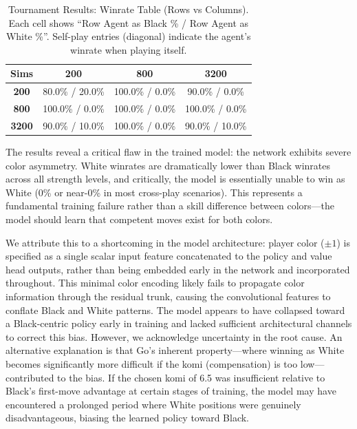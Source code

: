 \documentclass[12pt]{article}
\begin{document}
\begin{table}[h]
\centering
\caption{Tournament Results: Winrate Table (Rows vs Columns). Each cell shows ``Row Agent as Black \% / Row Agent as White \%''. Self-play entries (diagonal) indicate the agent's winrate when playing itself.}
\label{tab:tournament}
\begin{tabular}{c|ccc}
\hline
\textbf{Sims} & \textbf{200} & \textbf{800} & \textbf{3200} \\
\hline
\textbf{200}  & 80.0\% / 20.0\% & 100.0\% / 0.0\% & 90.0\% / 0.0\% \\
\textbf{800}  & 100.0\% / 0.0\% & 100.0\% / 0.0\% & 100.0\% / 0.0\% \\
\textbf{3200} & 90.0\% / 10.0\% & 100.0\% / 0.0\% & 90.0\% / 10.0\% \\
\hline
\end{tabular}
\end{table}

The results reveal a critical flaw in the trained model: the network exhibits severe color asymmetry. White winrates are dramatically lower than Black winrates across all strength levels, and critically, the model is essentially unable to win as White (0\% or near-0\% in most cross-play scenarios). This represents a fundamental training failure rather than a skill difference between colors—the model should learn that competent moves exist for both colors.

We attribute this to a shortcoming in the model architecture: player color ($\pm 1$) is specified as a single scalar input feature concatenated to the policy and value head outputs, rather than being embedded early in the network and incorporated throughout. This minimal color encoding likely fails to propagate color information through the residual trunk, causing the convolutional features to conflate Black and White patterns. The model appears to have collapsed toward a Black-centric policy early in training and lacked sufficient architectural channels to correct this bias. However, we acknowledge uncertainty in the root cause. An alternative explanation is that Go's inherent property—where winning as White becomes significantly more difficult if the komi (compensation) is too low—contributed to the bias. If the chosen komi of 6.5 was insufficient relative to Black's first-move advantage at certain stages of training, the model may have encountered a prolonged period where White positions were genuinely disadvantageous, biasing the learned policy toward Black. 
\end{document}
